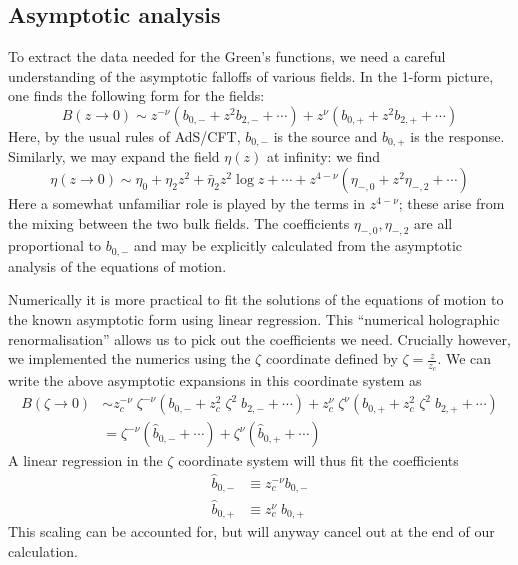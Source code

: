 \documentclass[aps,preprint,nofootinbib,preprintnumbers,eqsecnum,superscriptaddress]{revtex4}
\def\le{\left}
\def\ri{\right}
\begin{document}
\begin{appendix}
\subsection{Asymptotic analysis}
To extract the data needed for the Green's functions, we need a careful understanding of the asymptotic falloffs of various fields. In the 1-form picture, one finds the following form for the fields:
\begin{equation}
	B(z \to 0) \sim z^{-\nu} \le(b_{0,-} + z^2 b_{2,-} + \cdots\ri) + z^{\nu} \le(b_{0,+} + z^2 b_{2,+} + \cdots\ri)
\end{equation} 
Here, by the usual rules of AdS/CFT, $b_{0,-}$ is the source and $b_{0,+}$ is the response. Similarly, we may expand the field $\eta(z)$ at infinity: we find
\begin{equation}
	\eta(z \to 0) \sim \eta_0 + \eta_{2} z^2 + \bar{\eta}_2 z^2 \log z + \cdots + z^{4-\nu} \le(\eta_{-,0} + z^2 \eta_{-,2} + \cdots\ri)
\end{equation}
Here a somewhat unfamiliar role is played by the terms in $z^{4-\nu}$; these arise from the mixing between the two bulk fields. The coefficients $\eta_{-,0}, \eta_{-,2}$ are all proportional to $b_{0,-}$ and may be explicitly calculated from the asymptotic analysis of the equations of motion.

Numerically it is more practical to fit the solutions of the equations of motion to the known asymptotic form using linear regression. This ``numerical holographic renormalisation'' allows us to pick out the coefficients we need. Crucially however, we implemented the numerics using the $\zeta$ coordinate defined by $\zeta = \frac{z}{z_c}$. We can write the above asymptotic expansions in this coordinate system as
\begin{align}
	B(\zeta \to 0)
	& \sim z_c^{-\nu} \; \zeta^{-\nu} \left( b_{0,-} + z_c^2 \; \zeta^2 \; b_{2,-} + \cdots \right) + z_c^\nu \; \zeta^{\nu} \left(b_{0,+} + z_c^2 \; \zeta^2 \; b_{2,+} + \cdots \right)				\\ \nonumber 
	& = \zeta^{-\nu} \left(\hat{b}_{0,-} + \cdots \right) + \zeta^{\nu} \left(\hat{b}_{0,+} + \cdots \right)
\end{align} 
A linear regression in the $\zeta$ coordinate system will thus fit the coefficients
\begin{subequations}
	\begin{align}
		\hat{b}_{0,-} & \equiv z_c^{-\nu} b_{0,-}		\\
		\hat{b}_{0,+} & \equiv z_c^{\nu} \; b_{0,+}
	\end{align}
\end{subequations}
This scaling can be accounted for, but will anyway cancel out at the end of our calculation.


\end{appendix}
\end{document}
